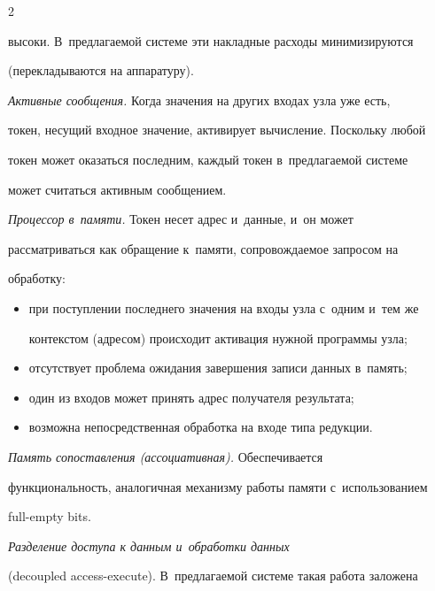 \begin{multicols}{2}
\begin{description}
высоки. В~предлагаемой системе эти накладные расходы минимизируются 

(перекладываются на аппаратуру).

\item[\,]  

  \textit{Активные сообщения.} Когда значения на других входах узла уже есть, 

токен, несущий входное значение, активирует вычисление. Поскольку любой 

токен может оказаться последним, каждый токен в~предлагаемой системе 

может считаться активным сообщением.

\item[\,]  

  \textit{Процессор в~памяти.} Токен несет адрес и~данные, и~он может 

рассматриваться как обращение к~памяти, сопровождаемое запросом на 

обработку:

  \begin{itemize}

  \item при поступлении последнего значения на входы узла с~одним и~тем же 

контекстом (адресом) происходит активация нужной программы \mbox{узла};

  \item отсутствует проблема ожидания завершения записи данных в~память;

  \item один из входов может принять адрес получателя результата;

  \item возможна непосредственная обработка на входе типа редукции.

  \end{itemize}

  \item[\,]

  \textit{Память сопоставления (ассоциативная).} Обеспечивается 

функциональность, аналогичная механизму работы памяти с~использованием 

full-empty bits.

  \item[\,]

  \textit{Разделение доступа к данным и~обработки данных}  

(decoupled access-execute). В~предлагаемой сис\-те\-ме такая работа заложена 


\end{description}
\end{multicols}
